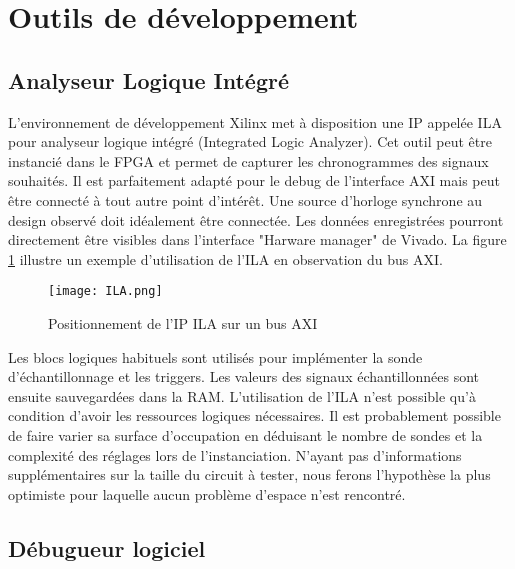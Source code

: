 \section{Outils de développement}

\subsection{Analyseur Logique Intégré}
L'environnement de développement Xilinx met à disposition une IP appelée ILA pour analyseur logique intégré (Integrated Logic Analyzer).
Cet outil peut être instancié dans le FPGA et permet de capturer les chronogrammes des signaux souhaités.
Il est parfaitement adapté pour le debug de l'interface AXI mais peut être connecté à tout autre point d'intérêt.
Une source d'horloge synchrone au design observé doit idéalement être connectée. \cite{ILA_doc}
Les données enregistrées pourront directement être visibles dans l'interface "Harware manager" de Vivado.
La figure \ref{fig:ILA} illustre un exemple d'utilisation de l'ILA en observation du bus AXI.
\begin{figure}[H]
    \centering
    \texttt{[image: ILA.png]}
    \caption{Positionnement de l'IP ILA sur un bus AXI}
    \label{fig:ILA}
\end{figure}
Les blocs logiques habituels sont utilisés pour implémenter la sonde d'échantillonnage et les triggers.
Les valeurs des signaux échantillonnées sont ensuite sauvegardées dans la RAM.
L'utilisation de l'ILA n'est possible qu'à condition d'avoir les ressources logiques nécessaires.
Il est probablement possible de faire varier sa surface d'occupation en déduisant le nombre de sondes et la complexité des réglages lors de l'instanciation.
N'ayant pas d'informations supplémentaires sur la taille du circuit à tester, nous ferons l'hypothèse la plus optimiste pour laquelle aucun problème d'espace n'est rencontré.

\subsection{Débugueur logiciel}
